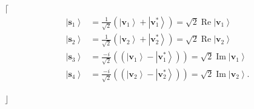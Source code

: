 \documentclass[aps,preprint]{revtex4}%
\begin{document}
$\lceil$%
\begin{align}
\left\vert \mathbf{s}_{1}\right\rangle  &  =\frac{1}{\sqrt{2}}\left(
\left\vert \mathbf{v}_{1}\right\rangle +\left\vert \mathbf{v}_{1}^{\ast
}\right\rangle \right)  =\sqrt{2}\operatorname{Re}\left\vert \mathbf{v}%
_{1}\right\rangle \nonumber\\
\left\vert \mathbf{s}_{2}\right\rangle  &  =\frac{1}{\sqrt{2}}\left(
\left\vert \mathbf{v}_{2}\right\rangle +\left\vert \mathbf{v}_{2}^{\ast
}\right\rangle \right)  =\sqrt{2}\operatorname{Re}\left\vert \mathbf{v}%
_{2}\right\rangle \\
\left\vert \mathbf{s}_{3}\right\rangle  &  =\frac{-i}{\sqrt{2}}\left(  \left(
\left\vert \mathbf{v}_{1}\right\rangle -\left\vert \mathbf{v}_{1}^{\ast
}\right\rangle \right)  \right)  =\sqrt{2}\operatorname{Im}\left\vert
\mathbf{v}_{1}\right\rangle \\
\left\vert \mathbf{s}_{4}\right\rangle  &  =\frac{-i}{\sqrt{2}}\left(  \left(
\left\vert \mathbf{v}_{2}\right\rangle -\left\vert \mathbf{v}_{2}^{\ast
}\right\rangle \right)  \right)  =\sqrt{2}\operatorname{Im}\left\vert
\mathbf{v}_{2}\right\rangle .
\end{align}


$\rfloor$
\end{document}
